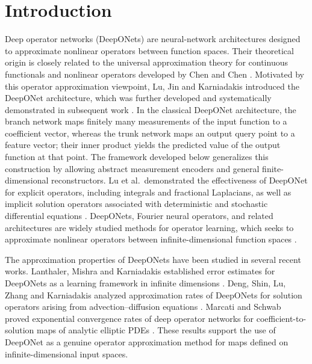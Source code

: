 \documentclass{article}
\numberwithin{equation}{section}
\theoremstyle{plain}
\newcounter{method}
\begin{document}
	
	
	
	\section{Introduction}
	Deep operator networks (DeepONets) are neural-network architectures designed to approximate nonlinear operators between function spaces. Their theoretical origin is closely related to the universal approximation theory for continuous functionals and nonlinear operators developed by Chen and Chen \cite{CC93,CC95}. Motivated by this operator approximation viewpoint, Lu, Jin and Karniadakis introduced the DeepONet architecture, which was further developed and systematically demonstrated in subsequent work \cite{LJK19,LJP+21}. In the classical DeepONet architecture, the branch network maps finitely many measurements of the input function to a coefficient vector, whereas the trunk network maps an output query point to a feature vector; their inner product yields the predicted value of the output function at that point. The framework developed below generalizes this construction by allowing abstract measurement encoders and general finite-dimensional reconstructors. Lu et al.~demonstrated the effectiveness of DeepONet for explicit operators, including integrals and fractional Laplacians, as well as implicit solution operators associated with deterministic and stochastic differential equations \cite{LJP+21}. DeepONets, Fourier neural operators, and related architectures are widely studied methods for operator learning, which seeks to approximate nonlinear operators between infinite-dimensional function spaces \cite{KLL+23}.
	
	The approximation properties of DeepONets have been studied in several recent works. Lanthaler, Mishra and Karniadakis established error estimates for DeepONets as a learning framework in infinite dimensions \cite{LMK22}. Deng, Shin, Lu, Zhang and Karniadakis analyzed approximation rates of DeepONets for solution operators arising from advection--diffusion equations \cite{DSL+22}. Marcati and Schwab proved exponential convergence rates of deep operator networks for coefficient-to-solution maps of analytic elliptic PDEs \cite{MS23}. These results support the use of DeepONet as a genuine operator approximation method for maps defined on infinite-dimensional input spaces.
	
\end{document}
